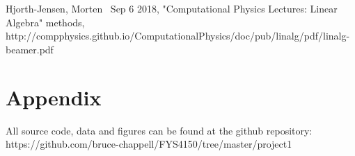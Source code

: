 \documentclass{emulateapj}
\begin{document}
\begin{thebibliography}{}
 Hjorth-Jensen, Morten \, Sep 6 2018, "Computational Physics Lectures: Linear Algebra"
methods, http://compphysics.github.io/ComputationalPhysics/doc/pub/linalg/pdf/linalg-beamer.pdf

\end{thebibliography}

\section{Appendix}
All source code, data and figures can be found at the github repository: https://github.com/bruce-chappell/FYS4150/tree/master/project1
\end{document}
